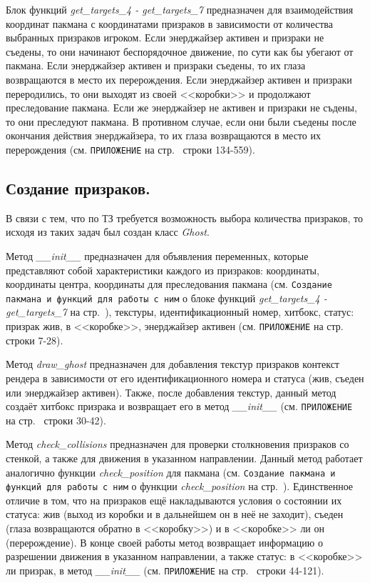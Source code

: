 Блок функций \textit{get\_targets\_4 - get\_targets\_7} предназначен для взаимодействия координат пакмана с координатами призраков в зависимости от количества выбранных призраков игроком. Если энерджайзер активен и призраки не съедены, то они начинают беспорядочное движение, по сути как бы убегают от пакмана. Если энерджайзер активен и призраки съедены, то их глаза возвращаются в место их перерождения. Если энерджайзер активен и призраки переродились, то они выходят из своей <<коробки>> и продолжают преследование пакмана. Если же энерджайзер не активен и призраки не съдены, то они преследуют пакмана. В противном случае, если они были съедены после окончания действия энерджайзера, то их глаза возвращаются в место их перерождения (см. \texttt{ПРИЛОЖЕНИЕ} на стр.~\pageref{code:player} строки 134-559).

\subsection{\label{subsec:ch02/sec01/sub06}Создание призраков.}
В связи с тем, что по ТЗ требуется возможность выбора количества призраков, то исходя из таких задач был создан класс \textit{Ghost}. 

Метод \textit{\_\_init\_\_} предназначен для объявления переменных, которые представляют собой характеристики каждого из призраков: координаты, координаты центра, координаты для преследования пакмана (см. \texttt{Создание пакмана и функций для работы с ним} о блоке функций \textit{get\_targets\_4 - get\_targets\_7} на стр.~\pageref{subsec:ch02/sec01/sub05}), текстуры, идентификационный номер, хитбокс, статус: призрак жив, в <<коробке>>, энерджайзер активен (см. \texttt{ПРИЛОЖЕНИЕ} на стр.~\pageref{code:ghost} строки 7-28).

Метод \textit{draw\_ghost} предназначен для добавления текстур призраков контекст рендера в зависимости от его идентификационного номера и статуса (жив, съеден или энерджайзер активен). Также, после добавления текстур, данный метод создаёт хитбокс призрака и возвращает его в метод \textit{\_\_init\_\_} (см. \texttt{ПРИЛОЖЕНИЕ} на стр.~\pageref{code:ghost} строки 30-42).

Метод \textit{check\_collisions} предназначен для проверки столкновения призраков со стенкой, а также для движения в указанном направлении. Данный метод работает аналогично функции \textit{check\_position} для пакмана (см. \texttt{Создание пакмана и функций для работы с ним} о функции \textit{check\_position} на стр.~\pageref{subsec:ch02/sec01/sub05}). Единственное отличие в том, что на призраков ещё накладываются условия о состоянии их статуса: жив (выход из коробки и в дальнейшем он в неё не заходит), съеден (глаза возвращаются обратно в <<коробку>>) и в <<коробке>> ли он (перерождение). В конце своей работы метод возвращает информацию о разрешении движения в указанном направлении, а также статус: в <<коробке>> ли призрак, в метод \textit{\_\_init\_\_} (см. \texttt{ПРИЛОЖЕНИЕ} на стр.~\pageref{code:ghost} строки 44-121).

